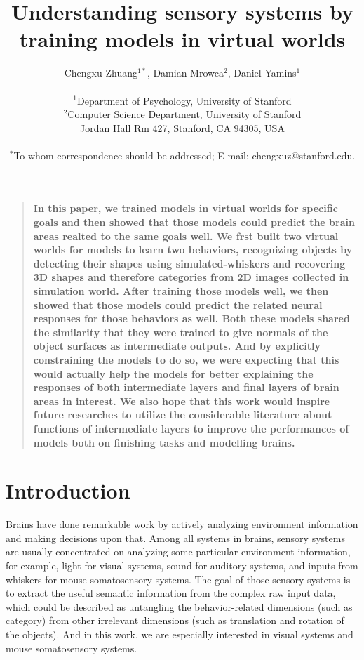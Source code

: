 \documentclass[12pt]{article}
\title{Understanding sensory systems by training models in virtual worlds}
\author
{Chengxu Zhuang$^{1\ast}$, Damian Mrowca$^{2}$, Daniel Yamins$^{1}$\\
\\
\normalsize{$^{1}$Department of Psychology, University of Stanford}\\
\normalsize{$^{2}$Computer Science Department, University of Stanford}\\
\normalsize{Jordan Hall Rm 427, Stanford, CA 94305, USA}\\
\\
\normalsize{$^\ast$To whom correspondence should be addressed; E-mail: chengxuz@stanford.edu.}
}
\date{}
\newenvironment{sciabstract}{%
\begin{quote} \bf}
{\end{quote}}
\begin{document}

\baselineskip24pt


\maketitle


\begin{sciabstract}
    In this paper, we trained models in virtual worlds for specific goals and then showed that those models could predict the brain areas realted to the same goals well.
    We frst built two virtual worlds for models to learn two behaviors, recognizing objects by detecting their shapes using simulated-whiskers and recovering 3D shapes and therefore categories from 2D images collected in simulation world. After training those models well, we then showed that those models could predict the related neural responses for those behaviors as well.
    Both these models shared the similarity that they were trained to give normals of the object surfaces as intermediate outputs. And by explicitly constraining the models to do so, we were expecting that this would actually help the models for better explaining the responses of both intermediate layers and final layers of brain areas in interest.
    We also hope that this work would inspire future researches to utilize the considerable literature about functions of intermediate layers to improve the performances of models both on finishing tasks and modelling brains.

\end{sciabstract}

\section*{Introduction}

Brains have done remarkable work by actively analyzing environment information and making decisions upon that. Among all systems in brains, sensory systems are usually concentrated on analyzing some particular environment information, for example, light for visual systems, sound for auditory systems, and inputs from whiskers for mouse somatosensory systems.
The goal of those sensory systems is to extract the useful semantic information from the complex raw input data, which could be described as untangling the behavior-related dimensions (such as category) from other irrelevant dimensions (such as translation and rotation of the objects)\cite{yamins2016using}. And in this work, we are especially interested in visual systems and mouse somatosensory systems.
\end{document}
